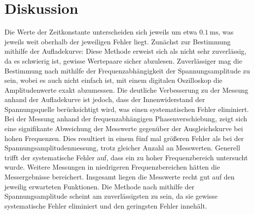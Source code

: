 \section{Diskussion}
\label{sec:Diskussion}
Die Werte der Zeitkonstante unterscheiden sich jeweils um etwa $\SI{0.1}{\milli\second}$, was jeweils weit oberhalb der jeweiligen Fehler liegt.
Zunächst zur Bestimmung mithilfe der Aufladekurve:
Diese Methode erweist sich als nicht sehr zuverlässig, da es schwierig ist, gewisse Wertepaare sicher abzulesen.
Zuverlässiger mag die Bestimmung nach mithilfe der Frequenzabhängigkeit der Spannungsamplitude zu sein, wobei es auch nicht einfach ist, mit einem digitalen Oszilloskop die Amplitudenwerte exakt abzumessen.
Die deutliche Verbesserung zu der Messung anhand der Aufladekurve ist jedoch, dass der Innenwiderstand der Spannungsquelle berücksichtigt wird, was einen systematischen Fehler eliminiert.
Bei der Messung anhand der frequenzabhängigen Phasenverschiebung, zeigt sich eine signifikante Abweichung der Messwerte gegenüber der Ausgleichskurve bei hohen Frequenzen.
Dies resultiert in einem fünf mal größeren Fehler als bei der Spannungsamplitudenmessung, trotz gleicher Anzahl an Messwerten.
Generell trifft der systematische Fehler auf, dass ein zu hoher Frequenzbereich untersucht wurde.
Weitere Messungen in niedrigeren Frequenzbereichen hätten die Messergebnisse bereichert.
Insgesamt liegen die Messwerte recht gut auf den jeweilig erwarteten Funktionen.
Die Methode nach mithilfe der Spannungsamplitude scheint am zuverlässigsten zu sein, da sie gewisse systematische Fehler eliminiert und den geringsten Fehler innehält.
